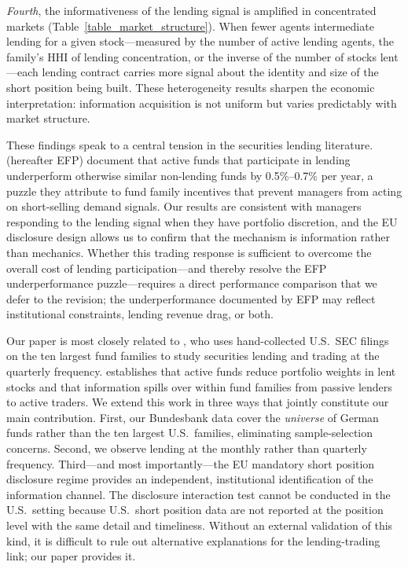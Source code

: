 \emph{Fourth}, the informativeness of the lending signal is amplified in concentrated markets (Table~\ref{table_market_structure}).  When fewer agents intermediate lending for a given stock---measured by the number of active lending agents, the family's HHI of lending concentration, or the inverse of the number of stocks lent---each lending contract carries more signal about the identity and size of the short position being built.  These heterogeneity results sharpen the economic interpretation: information acquisition is not uniform but varies predictably with market structure.

These findings speak to a central tension in the securities lending literature.  \cite{EvansFerreiraPrado2017} (hereafter EFP) document that active funds that participate in lending underperform otherwise similar non-lending funds by 0.5\%--0.7\% per year, a puzzle they attribute to fund family incentives that prevent managers from acting on short-selling demand signals.  Our results are consistent with managers responding to the lending signal when they have portfolio discretion, and the EU disclosure design allows us to confirm that the mechanism is information rather than mechanics.  Whether this trading response is sufficient to overcome the overall cost of lending participation---and thereby resolve the EFP underperformance puzzle---requires a direct performance comparison that we defer to the revision; the underperformance documented by EFP may reflect institutional constraints, lending revenue drag, or both.

Our paper is most closely related to \cite{Honkanen2025}, who uses hand-collected U.S.\ SEC filings on the ten largest fund families to study securities lending and trading at the quarterly frequency.  \cite{Honkanen2025} establishes that active funds reduce portfolio weights in lent stocks and that information spills over within fund families from passive lenders to active traders.  We extend this work in three ways that jointly constitute our main contribution.  First, our Bundesbank data cover the \emph{universe} of German funds rather than the ten largest U.S.\ families, eliminating sample-selection concerns.  Second, we observe lending at the monthly rather than quarterly frequency.  Third---and most importantly---the EU mandatory short position disclosure regime provides an independent, institutional identification of the information channel.  The disclosure interaction test cannot be conducted in the U.S.\ setting because U.S.\ short position data are not reported at the position level with the same detail and timeliness.  Without an external validation of this kind, it is difficult to rule out alternative explanations for the lending-trading link; our paper provides it.


